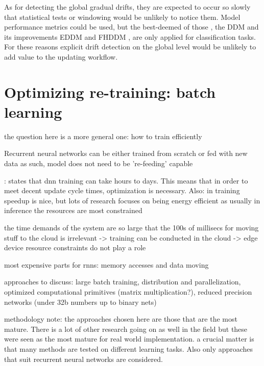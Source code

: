 As for detecting the global gradual drifts, they are expected to occur so slowly that statistical tests or windowing would be unlikely to notice them. Model performance metrics could be used, but the best-deemed of those \cite{celikAdaptationStrategiesAutomated2021} \cite{madridAutoMLPresenceDrift2019}, the DDM \cite{gamaLearningDriftDetection2004} and its improvements EDDM \cite{baena-garciaEarlyDriftDetection2006} and FHDDM \cite{pesaranghaderFastHoeffdingDrift2016}, are only applied for classification tasks. For these reasons explicit drift detection on the global level would be unlikely to add value to the updating workflow. 


\section{Optimizing re-training: batch learning}

the question here is a more general one: how to train efficiently

Recurrent neural networks can be either trained from scratch or fed with new data as such, model does not need to be 're-feeding' capable

\cite{szeEfficientProcessingDeep2017} \cite{jia_highly_2018} \cite{de_sa_high-accuracy_2018}: %
states that dnn training can take hours to days. This means that in order to meet decent update cycle times, optimization is necessary. Also: in training speedup is nice, but lots of research focuses on being energy efficient as usually in inference the resources are most constrained

the time demands of the system are so large that the 100s of millisecs for moving stuff to the cloud is irrelevant -> training can be conducted in the cloud -> edge device resource constraints do not play a role

most expensive parts for rnns: memory accesses and data moving

approaches to discuss: large batch training, distribution and parallelization, optimized computational primitives (matrix multiplication?), reduced precision networks (under 32b numbers up to binary nets)

methodology note: the approaches chosen here are those that are the most mature. There is a lot of other research going on as well in the field but these were seen as the most mature for real world implementation. a crucial matter is that many methods are tested on different learning tasks. Also only approaches that suit recurrent neural networks are considered.

